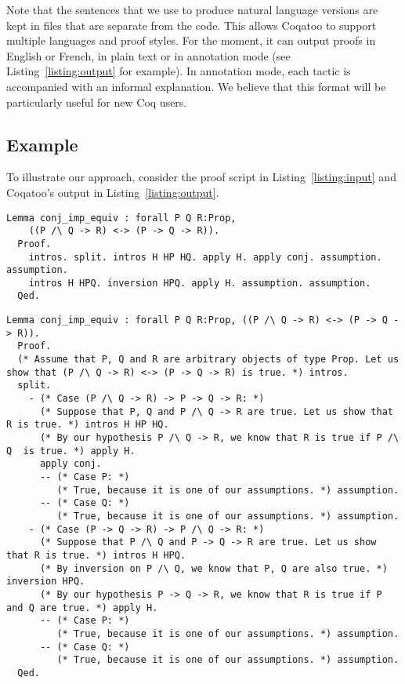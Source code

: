 \documentclass[sigplan,9pt]{acmart}\settopmatter{printfolios=true,printccs=false,printacmref=false}
\begin{document}
Note that the sentences that we use to produce natural language versions are kept in files that are separate from the code. This allows Coqatoo to support multiple languages and proof styles. For the moment, it can output proofs in English or French, in plain text or in annotation mode (see Listing~\ref{listing:output} for example). In annotation mode, each tactic is accompanied with an informal explanation. We believe that this format will be particularly useful for new Coq users.

\subsection{Example}
To illustrate our approach, consider the proof script in Listing~\ref{listing:input} and Coqatoo's output in Listing~\ref{listing:output}.
\begin{lstlisting}[label=listing:input,captionpos=b,caption=Proof script given as input]
  Lemma conj_imp_equiv : forall P Q R:Prop, 
    ((P /\ Q -> R) <-> (P -> Q -> R)).
  Proof.
    intros. split. intros H HP HQ. apply H. apply conj. assumption. assumption. 
    intros H HPQ. inversion HPQ. apply H. assumption. assumption.
  Qed.
\end{lstlisting}

\begin{figure*}
\begin{lstlisting}[label=listing:output, captionpos=b, caption={Output in annotation mode}]
  Lemma conj_imp_equiv : forall P Q R:Prop, ((P /\ Q -> R) <-> (P -> Q -> R)).
  Proof.
  (* Assume that P, Q and R are arbitrary objects of type Prop. Let us show that (P /\ Q -> R) <-> (P -> Q -> R) is true. *) intros.
  split.
    - (* Case (P /\ Q -> R) -> P -> Q -> R: *) 
      (* Suppose that P, Q and P /\ Q -> R are true. Let us show that R is true. *) intros H HP HQ.
      (* By our hypothesis P /\ Q -> R, we know that R is true if P /\ Q  is true. *) apply H.
      apply conj.
      -- (* Case P: *)
         (* True, because it is one of our assumptions. *) assumption.
      -- (* Case Q: *)
         (* True, because it is one of our assumptions. *) assumption.
    - (* Case (P -> Q -> R) -> P /\ Q -> R: *)
      (* Suppose that P /\ Q and P -> Q -> R are true. Let us show that R is true. *) intros H HPQ.
      (* By inversion on P /\ Q, we know that P, Q are also true. *) inversion HPQ.
      (* By our hypothesis P -> Q -> R, we know that R is true if P and Q are true. *) apply H.
      -- (* Case P: *)
         (* True, because it is one of our assumptions. *) assumption.
      -- (* Case Q: *)
         (* True, because it is one of our assumptions. *) assumption.
  Qed.
\end{lstlisting}
\end{figure*}
\end{document}
